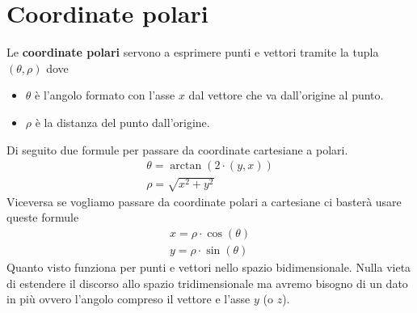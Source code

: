 \section{Coordinate polari}
Le \textbf{coordinate polari} servono a esprimere punti e vettori tramite la tupla
$(\theta, \rho)$ dove
\begin{itemize}
	\item $\theta$ \`e l'angolo formato con l'asse $x$ dal vettore che va dall'origine al punto.
	\item $\rho$ \`e la distanza del punto dall'origine.
\end{itemize}
Di seguito due formule per passare da coordinate cartesiane a polari.
\begin{gather*}
	\theta = \arctan(2 \cdot (y, x)) \\
	\rho = \sqrt{x^2 + y^2}
\end{gather*}
Viceversa se vogliamo passare da coordinate polari a cartesiane ci baster\`a usare queste formule
\begin{gather*}
	x = \rho \cdot \cos(\theta) \\
	y = \rho \cdot \sin(\theta)
\end{gather*}
Quanto visto funziona per punti e vettori nello spazio bidimensionale. Nulla vieta di estendere il discorso allo spazio
tridimensionale ma avremo bisogno di un dato in pi\`u ovvero l'angolo compreso il vettore e l'asse $y$ (o $z$).

